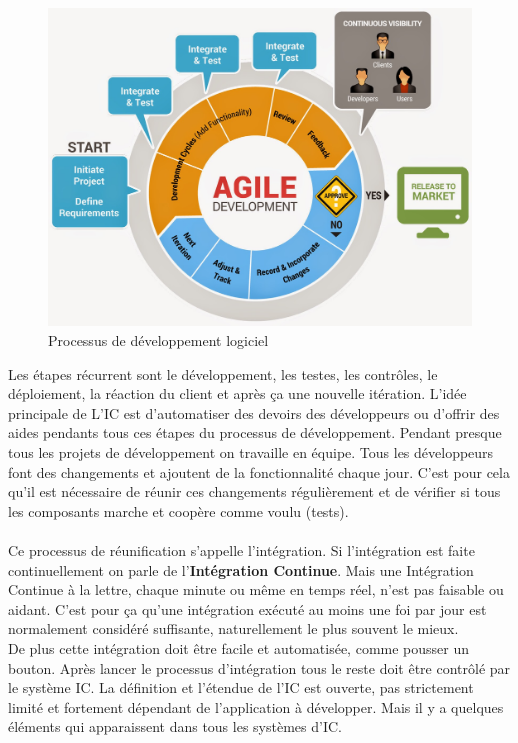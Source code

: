 \begin{figure}[H]
	\centering
		\includegraphics[scale=0.25]{bilder/agile_methodology}
	\caption{Processus de développement logiciel}
	\label{fig:processus}
\end{figure}

Les étapes récurrent sont le développement, les testes, les contrôles, le déploiement, la réaction du client et après ça une nouvelle itération. L'idée principale de L'IC est d'automatiser des devoirs des développeurs ou d'offrir des aides pendants tous ces étapes du processus de développement.
Pendant presque tous les projets de développement on travaille en équipe. Tous les développeurs font des changements et ajoutent de la fonctionnalité chaque jour. C'est pour cela qu'il est nécessaire de réunir ces changements régulièrement et de vérifier si tous les composants marche et coopère comme voulu (tests).\\\\
Ce processus de réunification s'appelle l'intégration. Si l'intégration est faite continuellement on parle de l'\textbf{Intégration Continue}. Mais une Intégration Continue à la lettre, chaque minute ou même en temps réel, n'est pas faisable ou aidant. C'est pour ça qu'une intégration exécuté au moins une foi par jour est normalement considéré suffisante, naturellement le plus souvent le mieux.\\
De plus cette intégration doit être facile et automatisée, comme pousser un bouton. Après lancer le processus d'intégration tous le reste doit être contrôlé par le système IC. La définition et l'étendue de l'IC est ouverte, pas strictement limité et fortement dépendant de l'application à développer. Mais il y a quelques éléments qui apparaissent dans tous les systèmes d'IC.
\newpage

